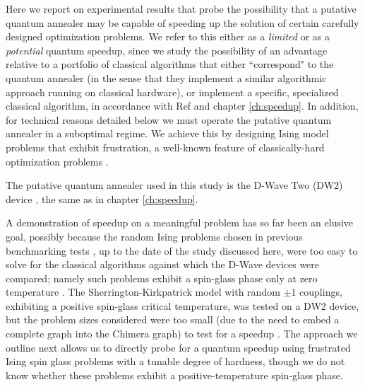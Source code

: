 Here we report on experimental results that probe the possibility that a putative quantum annealer may be capable of speeding up the solution of certain carefully designed optimization problems. We refer to this either as a \emph{limited} or as a \emph{potential} quantum speedup, since we study the possibility of an advantage relative to a portfolio of classical algorithms that either ``correspond" to the quantum annealer (in the sense that they implement a similar algorithmic approach running on classical hardware), or implement a specific, specialized classical algorithm, in accordance with Ref \cite{speedup} and chapter \ref{ch:speedup}.
In addition, for technical reasons detailed below we must operate the putative quantum annealer in a suboptimal regime. We achieve this by designing Ising model problems that exhibit frustration, a well-known feature of classically-hard optimization problems \cite{Binder86,Nishimori-book}.

The putative quantum annealer used in this study is the D-Wave Two (DW2) device \cite{Bunyk:2014hb}, the same as in chapter \ref{ch:speedup}.

A demonstration of speedup on a meaningful problem has so far been an elusive goal, possibly because the random Ising problems chosen in previous benchmarking tests \cite{q108,speedup}, up to the date of the study discussed here, were too easy to solve for the classical algorithms against which the D-Wave devices were compared; namely such problems exhibit a spin-glass phase only at zero temperature \cite{2014Katzgraber}. The Sherrington-Kirkpatrick model with random $\pm 1$ couplings, exhibiting a positive spin-glass critical temperature, was tested on a DW2 device, but the problem sizes considered were too small (due to the need to embed a complete graph into the Chimera graph) to test for a speedup \cite{Venturelli:2014nx}. The approach we outline next allows us to directly probe for a quantum speedup using frustrated Ising spin glass problems with a tunable degree of hardness, though we do not know whether these problems exhibit a positive-temperature spin-glass phase.

